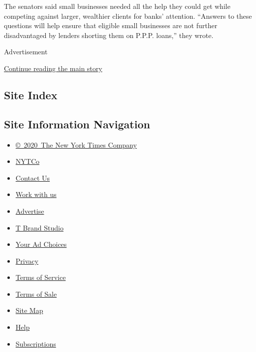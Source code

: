 The senators said small businesses needed all the help they could get
while competing against larger, wealthier clients for banks' attention.
``Answers to these questions will help ensure that eligible small
businesses are not further disadvantaged by lenders shorting them on
P.P.P. loans,'' they wrote.

Advertisement

\protect\hyperlink{after-bottom}{Continue reading the main story}

\hypertarget{site-index}{%
\subsection{Site Index}\label{site-index}}

\hypertarget{site-information-navigation}{%
\subsection{Site Information
Navigation}\label{site-information-navigation}}

\begin{itemize}
\tightlist
\item
  \href{https://help.nytimes3xbfgragh.onion/hc/en-us/articles/115014792127-Copyright-notice}{©~2020~The
  New York Times Company}
\end{itemize}

\begin{itemize}
\tightlist
\item
  \href{https://www.nytco.com/}{NYTCo}
\item
  \href{https://help.nytimes3xbfgragh.onion/hc/en-us/articles/115015385887-Contact-Us}{Contact
  Us}
\item
  \href{https://www.nytco.com/careers/}{Work with us}
\item
  \href{https://nytmediakit.com/}{Advertise}
\item
  \href{http://www.tbrandstudio.com/}{T Brand Studio}
\item
  \href{https://www.nytimes3xbfgragh.onion/privacy/cookie-policy\#how-do-i-manage-trackers}{Your
  Ad Choices}
\item
  \href{https://www.nytimes3xbfgragh.onion/privacy}{Privacy}
\item
  \href{https://help.nytimes3xbfgragh.onion/hc/en-us/articles/115014893428-Terms-of-service}{Terms
  of Service}
\item
  \href{https://help.nytimes3xbfgragh.onion/hc/en-us/articles/115014893968-Terms-of-sale}{Terms
  of Sale}
\item
  \href{https://spiderbites.nytimes3xbfgragh.onion}{Site Map}
\item
  \href{https://help.nytimes3xbfgragh.onion/hc/en-us}{Help}
\item
  \href{https://www.nytimes3xbfgragh.onion/subscription?campaignId=37WXW}{Subscriptions}
\end{itemize}
